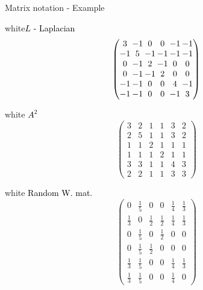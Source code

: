 \begin{textbox}{Matrix notation - Example}
\begin{multibox}{2}
    \begin{subbox}{white}{\textcolor{black}{$L$ - Laplacian }}
      \centering
      \footnotesize
      \[
        \setlength\arraycolsep{1pt}
        \begin{pmatrix}
          3  & -1 & 0  & 0  & -1 & -1 \\
          -1 & 5  & -1 & -1 & -1 & -1 \\
          0  & -1 & 2  & -1 & 0  & 0  \\
          0  & -1 & -1 & 2  & 0  & 0  \\
          -1 & -1 & 0  & 0  & 4  & -1 \\
          -1 & -1 & 0  & 0  & -1 & 3
        \end{pmatrix}
      \]
    \end{subbox}
    
    \begin{subbox}{white}{\textcolor{black}{ $A^2$}}
      \centering
      \footnotesize
      \[\begin{pmatrix}
          3 & 2 & 1 & 1 & 3 & 2 \\
          2 & 5 & 1 & 1 & 3 & 2 \\
          1 & 1 & 2 & 1 & 1 & 1 \\
          1 & 1 & 1 & 2 & 1 & 1 \\
          3 & 3 & 1 & 1 & 4 & 3 \\
          2 & 2 & 1 & 1 & 3 & 3
        \end{pmatrix}
      \]
    \end{subbox}
    
    \begin{subbox}{white}{\textcolor{black}{ Random W. mat.}}
      \centering
      \footnotesize
      \setlength\arraycolsep{3pt}
      \[\begin{pmatrix}
          0           & \frac{1}{5} & 0           & 0           & \frac{1}{4} & \frac{1}{3} \\[6pt]
          \frac{1}{3} & 0           & \frac{1}{2} & \frac{1}{2} & \frac{1}{4} & \frac{1}{3} \\[6pt]
          0           & \frac{1}{5} & 0           & \frac{1}{2} & 0           & 0           \\[6pt]
          0           & \frac{1}{5} & \frac{1}{2} & 0           & 0           & 0           \\[6pt]
          \frac{1}{3} & \frac{1}{5} & 0           & 0           & \frac{1}{4} & \frac{1}{3} \\[6pt]
          \frac{1}{3} & \frac{1}{5} & 0           & 0           & \frac{1}{4} & 0
        \end{pmatrix}
      \]
    \end{subbox}
  \end{multibox}
\end{textbox}


